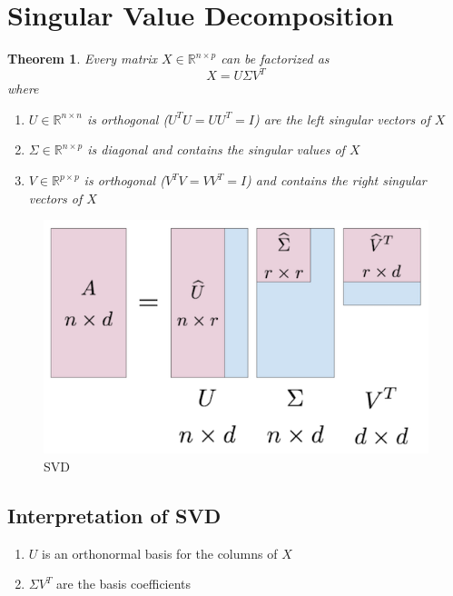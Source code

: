 \documentclass[12pt]{article}
\newtheorem{theorem}{Theorem}
\theoremstyle{definition}
\newcommand{\R}{\mathbb{R}}
\begin{document}
\section{Singular Value Decomposition}
\begin{theorem}
	Every matrix $X \in \R^{n \times p}$ can be factorized as 
	\begin{equation}
		X = U\Sigma V^T
	\end{equation}
	where
	\begin{enumerate}
		\item $U \in \R^{n \times n}$ is orthogonal ($U^TU = UU^T = I$) are the left singular vectors of $X$
		\item $\Sigma \in \R^{n \times p}$ is diagonal and contains the singular values of $X$
		\item $V \in \R^{p \times p}$ is orthogonal ($V^T V = VV^T = I$) and contains the right singular vectors of $X$
	\end{enumerate}
\end{theorem}

\begin{figure}[H]
	\begin{center}
		\includegraphics[scale=.5]{svd.png}
	\end{center}
	\caption{SVD}
\end{figure}


\subsection{Interpretation of SVD}
\begin{enumerate}
	\item $U$ is an orthonormal basis for the columns of $X$
	\item $\Sigma V^T$ are the basis coefficients
\end{enumerate}
\end{document}
